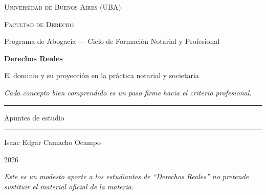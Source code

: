 \documentclass[12pt,oneside]{book}
\newcommand{\universidad}{Universidad de Buenos Aires (UBA)}
\newcommand{\facultad}{Facultad de Derecho}
\newcommand{\carrera}{Programa de Abogacía --- Ciclo de Formación Notarial y Profesional}
\newcommand{\materia}{Derechos Reales}
\newcommand{\titulo}{El dominio y su proyección en la práctica notarial y societaria}
\newcommand{\autor}{Isaac Edgar Camacho Ocampo}
\newcommand{\anio}{2026}
\newcommand{\reflexion}{Cada concepto bien comprendido es un paso firme hacia el criterio profesional.}
\begin{document}

\begin{titlepage}

\thispagestyle{empty}

\begin{center}

\vspace*{1cm}

{\large \textsc{\universidad}}

\vspace{0.2cm}

{\large \textsc{\facultad}}

\vspace{0.2cm}

{\large \carrera}

\vspace{3cm}

{\Huge \textbf{\materia}}

\vspace{1cm}

{\LARGE \titulo}

\vspace{0.8cm}

\textit{\reflexion}

\vspace{1.2cm}

\rule{0.70\textwidth}{0.5pt}

\vspace{0.5cm}

{\large Apuntes de estudio}

\vspace{0.5cm}

\rule{0.70\textwidth}{0.5pt}

\vfill

{\large \autor}

\vspace{0.3cm}

{\large \anio}

\end{center}

\vfill

\begin{flushleft}
\textit{Este es un modesto aporte a los estudiantes de ``Derechos Reales'' no pretende sustituir el material oficial de la materia.}
\end{flushleft}

\end{titlepage}
\end{document}
